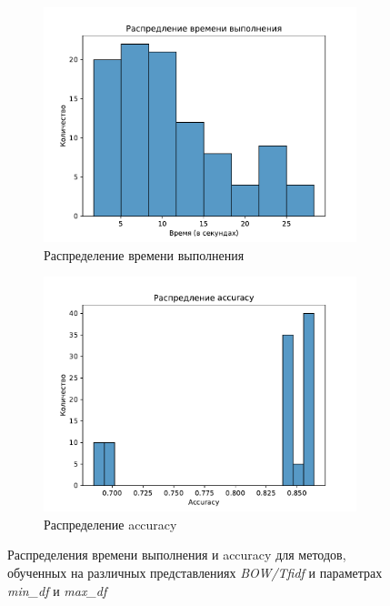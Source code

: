 \documentclass[14pt]{extarticle}
\begin{document}
\begin{figure}[ht]
    \centering
    \begin{subfigure}{0.48\textwidth}
        \centering
        \includegraphics[width=\linewidth]
        {exp_8_min_max_df_time_raspred.pdf}
        \caption{Распределение времени выполнения}
        \label{fig:exp_8_min_max_df_time_raspred}
    \end{subfigure}
    \hspace{-0.5em}
    \begin{subfigure}{0.48\textwidth}
        \centering
        \includegraphics[width=\linewidth]
        {exp_8_min_max_df_acc_raspred.pdf}
        \caption{Распределение accuracy}
        \label{fig:image2}
    \end{subfigure}
    \caption{Распределения времени выполнения и accuracy для методов, обученных на различных представлениях \textit{BOW/Tfidf} и параметрах \textit{min\_df} и \textit{max\_df}}
    \label{fig:exp_8_min_max_df_time_acc_raspred}
\end{figure}
\end{document}
